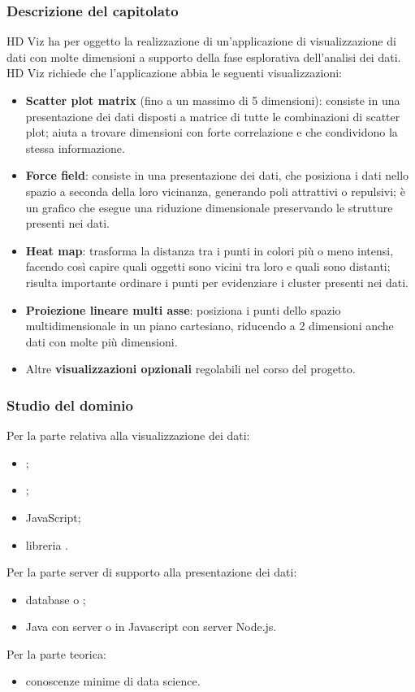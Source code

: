 \subsubsection{Descrizione del capitolato}
HD Viz ha per oggetto la realizzazione di un'applicazione di visualizzazione di dati con molte dimensioni a supporto della fase esplorativa dell'analisi dei dati. HD Viz richiede che l'applicazione abbia le seguenti visualizzazioni:
\begin{itemize}
	\item \textbf{Scatter plot matrix} (fino a un massimo di 5 dimensioni): consiste in una presentazione dei dati disposti a matrice di tutte le combinazioni di scatter plot; aiuta a trovare dimensioni con forte correlazione e che condividono la stessa informazione.
	\item \textbf{Force field}: consiste in una presentazione dei dati, che posiziona i dati nello spazio a seconda della loro vicinanza, generando poli attrattivi o repulsivi; è un grafico che esegue una riduzione dimensionale preservando le strutture presenti nei dati.
	\item \textbf{Heat map}: trasforma la distanza tra i punti in colori più o meno intensi, facendo così capire quali oggetti sono vicini tra loro e quali sono distanti; risulta importante ordinare i punti per evidenziare i cluster presenti nei dati.
	\item \textbf{Proiezione lineare multi asse}: posiziona i punti dello spazio multidimensionale in un piano cartesiano, riducendo a 2 dimensioni anche dati con molte più dimensioni.
	\item Altre \textbf{visualizzazioni opzionali} regolabili nel corso del progetto.
\end{itemize}
\subsubsection{Studio del dominio}
Per la parte relativa alla visualizzazione dei dati:
\begin{itemize}
	\item {};
	\item {};
	\item JavaScript;
	\item libreria .
\end{itemize}
Per la parte server di supporto alla presentazione dei dati:
\begin{itemize}
	\item database  o ;
	\item Java con server  o in Javascript con server Node.js.
\end{itemize}
Per la parte teorica:
\begin{itemize}
	\item conoscenze minime di data science.
\end{itemize}
